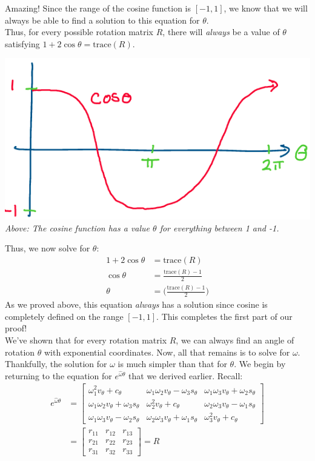 \documentclass[oneside]{book}
\begin{document}
Amazing! Since the range of the cosine function is $[-1, 1]$, we know that we will always be able to find a solution to this equation for $\theta$.\\
Thus, for every possible rotation matrix $R$, there will \textit{always} be a value of $\theta$ satisfying $1 + 2\cos\theta = \mathrm{trace}(R)$.
\begin{center}
    \includegraphics[scale=0.5]{images/cosine.png}\\
    \textit{Above: The cosine function has a value $\theta$ for everything between 1 and -1.}
\end{center}
Thus, we now solve for $\theta$:
\begin{align}
    1 + 2\cos\theta &= \mathrm{trace}(R)\\
    \cos\theta &= \frac{\mathrm{trace}(R) - 1}{2}\\
    \theta &= \Big( \frac{\mathrm{trace}(R) - 1}{2}\Big)
\end{align}
As we proved above, this equation \textit{always} has a solution since cosine is completely defined on the range $[-1, 1]$. This completes the first part of our proof! \\
We've shown that for every rotation matrix $R$, we can always find an angle of rotation $\theta$ with exponential coordinates. Now, all that remains is to solve for $\omega$.\\
Thankfully, the solution for $\omega$ is much simpler than that for $\theta$. We begin by returning to the equation for $e^{\hat\omega\theta}$ that we derived earlier. Recall:
\begin{align}
    e^{\hat\omega\theta} &= 
    \begin{bmatrix}
    \omega_1^2v_\theta + c_\theta & \omega_1\omega_2v_\theta-\omega_3s_\theta & \omega_1\omega_3v_\theta+\omega_2s_\theta\\
    \omega_1\omega_2v_\theta+\omega_3s_\theta & \omega_2^2v_\theta+c_\theta & \omega_2\omega_3v_\theta-\omega_1s_\theta\\
    \omega_1\omega_3v_\theta-\omega_2s_\theta & \omega_2\omega_3v_\theta+\omega_1s_\theta & \omega_3^2v_\theta+c_\theta
    \end{bmatrix}\\
    &= \begin{bmatrix}
    r_{11} & r_{12} & r_{13}\\
    r_{21} & r_{22} & r_{23}\\
    r_{31} & r_{32} & r_{33}
    \end{bmatrix} = R
\end{align}
\end{document}
